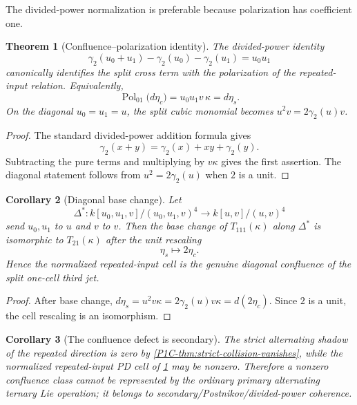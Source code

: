 \documentclass[11pt]{article}
\newtheorem{theorem}{Theorem}[section]
\newtheorem{corollary}[theorem]{Corollary}
\theoremstyle{remark}
\begin{document}
The divided-power normalization is preferable because polarization has coefficient one.

\begin{theorem}[Confluence--polarization identity]\label{P1C-thm:confluence-polarization}
The divided-power identity
\begin{equation}\label{P1C-eq:pd-polarization}
 \gamma_2(u_0+u_1)-\gamma_2(u_0)-\gamma_2(u_1)=u_0u_1
\end{equation}
canonically identifies the split cross term with the polarization of the repeated-input relation.  Equivalently,
\[
 \operatorname{Pol}_{01}\bigl(d\eta_c\bigr)
 =u_0u_1v\,\kappa
 =d\eta_s.
\]
On the diagonal $u_0=u_1=u$, the split cubic monomial becomes $u^2v=2\gamma_2(u)v$.
\end{theorem}

\begin{proof}
The standard divided-power addition formula gives
\[
 \gamma_2(x+y)=\gamma_2(x)+xy+\gamma_2(y).
\]
Subtracting the pure terms and multiplying by $v\kappa$ gives the first assertion.  The diagonal statement follows from $u^2=2\gamma_2(u)$ when $2$ is a unit.
\end{proof}

\begin{corollary}[Diagonal base change]\label{P1C-cor:diagonal-base-change}
Let
\[
 \Delta^*:k[u_0,u_1,v]/(u_0,u_1,v)^4
 \longrightarrow k[u,v]/(u,v)^4
\]
send $u_0,u_1$ to $u$ and $v$ to $v$.  Then the base change of $T_{111}(\kappa)$ along $\Delta^*$ is isomorphic to $T_{21}(\kappa)$ after the unit rescaling
\[
 \eta_s\longmapsto 2\eta_c.
\]
Hence the normalized repeated-input cell is the genuine diagonal confluence of the split one-cell third jet.
\end{corollary}

\begin{proof}
After base change, $d\eta_s=u^2v\kappa=2\gamma_2(u)v\kappa=d(2\eta_c)$.  Since $2$ is a unit, the cell rescaling is an isomorphism.
\end{proof}

\begin{corollary}[The confluence defect is secondary]\label{P1C-cor:confluence-secondary}
The strict alternating shadow of the repeated direction is zero by \cref{P1C-thm:strict-collision-vanishes}, while the normalized repeated-input PD cell of \cref{P1C-thm:confluence-polarization} may be nonzero.  Therefore a nonzero confluence class cannot be represented by the ordinary primary alternating ternary Lie operation; it belongs to secondary/Postnikov/divided-power coherence.
\end{corollary}
\end{document}
